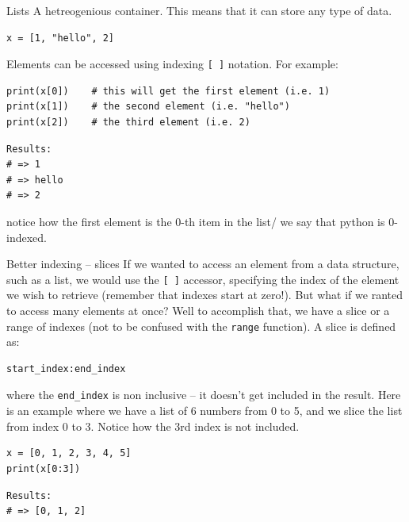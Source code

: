 \documentclass[10pt]{beamer}
\begin{document}
\begin{frame}[label={sec:org96cffb3},fragile]{Lists}
 A hetreogenious container. This means that it can store any type of data.

\begin{verbatim}
x = [1, "hello", 2]
\end{verbatim}

Elements can be accessed using indexing \texttt{[ ]} notation. For example:

\begin{verbatim}
print(x[0])    # this will get the first element (i.e. 1)
print(x[1])    # the second element (i.e. "hello")
print(x[2])    # the third element (i.e. 2)
\end{verbatim}

\begin{verbatim}
Results: 
# => 1
# => hello
# => 2
\end{verbatim}


\alert{notice how the first element is the 0-th item in the list/} we say that python is
0-indexed.
\end{frame}

\begin{frame}[label={sec:orgf8b4e1c},fragile]{Better indexing -- slices}
 If we wanted to access an element from a data structure, such as a list, we would use
the \texttt{[ ]} accessor, specifying the index of the element we wish to retrieve (remember
that indexes start at zero!). But what if we ranted to access many elements at once?
Well to accomplish that, we have a slice or a range of indexes (not to be confused
with the \texttt{range} function). A slice is defined as:

\begin{verbatim}
start_index:end_index
\end{verbatim}

where the \texttt{end\_index} is non inclusive -- it doesn't get included in the result. Here
is an example where we have a list of 6 numbers from 0 to 5, and we slice the list from index
0 to 3. Notice how the 3rd index is not included.

\begin{verbatim}
x = [0, 1, 2, 3, 4, 5]
print(x[0:3])
\end{verbatim}

\begin{verbatim}
Results: 
# => [0, 1, 2]
\end{verbatim}
\end{frame}
\end{document}
